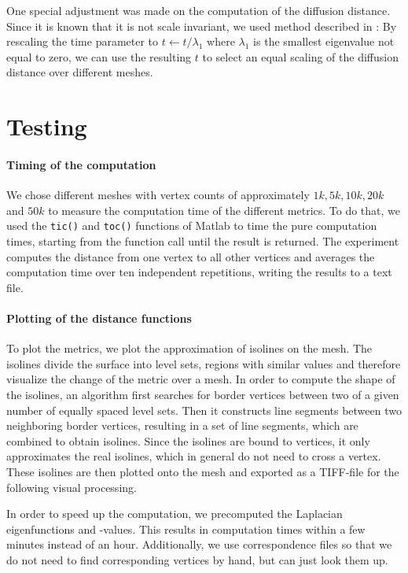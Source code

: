 One special adjustment was made on the computation of the diffusion distance.
Since it is known that it is not scale invariant, we used method described in \cite{lipman2010biharmonic}:
By rescaling the time parameter to $t \leftarrow t/\lambda_1$ where $\lambda_1$ is the smallest eigenvalue not equal to zero, we can use the resulting $t$ to select an equal scaling of the diffusion distance over different meshes.

\section{Testing}
\paragraph{Timing of the computation}
We chose different meshes with vertex counts of approximately $1k, 5k, 10k, 20k$ and $50k$ to measure the computation time of the different metrics.
To do that, we used the \texttt{tic()} and \texttt{toc()} functions of Matlab to time the pure computation times, starting from the function call until the result is returned.
The experiment computes the distance from one vertex to all other vertices and averages the computation time over ten independent repetitions, writing the results to a text file.

\paragraph{Plotting of the distance functions}
To plot the metrics, we plot the approximation of isolines on the mesh.
The isolines divide the surface into level sets, regions with similar values and therefore visualize the change of the metric over a mesh.
In order to compute the shape of the isolines, an algorithm first searches for border vertices between two of a given number of equally spaced level sets.
Then it constructs line segments between two neighboring border vertices, resulting in a set of line segments, which are combined to obtain isolines.
Since the isolines are bound to vertices, it only approximates the real isolines, which in general do not need to cross a vertex.
These isolines are then plotted onto the mesh and exported as a TIFF-file for the following visual processing.

In order to speed up the computation, we precomputed the Laplacian eigenfunctions and -values.
This results in computation times within a few minutes instead of an hour.
Additionally, we use correspondence files so that we do not need to find corresponding vertices by hand, but can just look them up.

